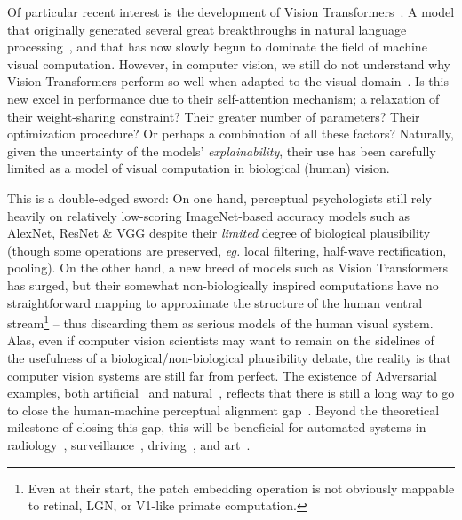 \documentclass{article} %
\begin{document}
Of particular recent interest is the development of Vision Transformers~\citep{dosovitskiy2021an}. A model that originally generated several great breakthroughs in natural language processing~\citep{vaswani2017attention}, and that has now slowly begun to dominate the field of machine visual computation. However, in computer vision, we still do not understand why Vision Transformers perform so well when adapted to the visual domain~\citep{bhojanapalli2021understanding}. Is this new excel in performance due to their self-attention mechanism; a relaxation of their weight-sharing constraint? Their greater number of parameters? Their optimization procedure? Or perhaps a combination of all these factors? Naturally, given the uncertainty of the models' \textit{explainability}, their use has been carefully limited as a model of visual computation in biological (human) vision. 

This is a double-edged sword: On one hand, perceptual psychologists still rely heavily on relatively low-scoring ImageNet-based accuracy models such as AlexNet, ResNet \& VGG despite their \textit{limited} degree of biological plausibility (though some operations are preserved, \textit{eg.} local filtering, half-wave rectification, pooling). On the other hand, a new breed of models such as Vision Transformers has surged, but their somewhat non-biologically inspired computations have no straightforward mapping to approximate the structure of the human ventral stream\footnote{Even at their start, the patch embedding operation is not obviously mappable to retinal, LGN, or V1-like primate computation.} -- thus discarding them as serious models of the human visual system. Alas, even if computer vision scientists may want to remain on the sidelines of the usefulness of a biological/non-biological plausibility debate, the reality is that computer vision systems are still far from perfect. The existence of Adversarial examples, both artificial~\citep{goodfellow2014explaining,szegedy2014intriguing} and natural~\citep{hendrycks2021natural}, reflects that there is still a long way to go to close the human-machine perceptual alignment gap~\citep{geirhos2021partial}. Beyond the theoretical milestone of closing this gap, this will be beneficial for automated systems in radiology~\citep{hosny2018artificial}, surveillance~\citep{deza2019assessment}, driving~\citep{huang2020autonomous}, and art~\citep{ramesh2022hierarchical}.
\end{document}
